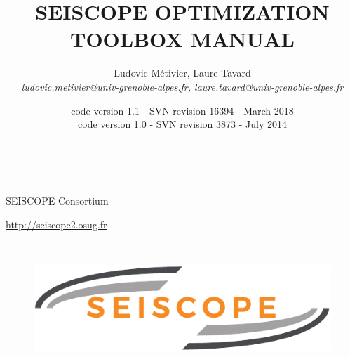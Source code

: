 \documentclass[a4paper,twoside,final,onecolumn,11pt,openright]{article}
\begin{document}
\title{SEISCOPE OPTIMIZATION TOOLBOX MANUAL}

\date{code version 1.1 - SVN revision 16394 - March 2018\\
code version 1.0 - SVN revision 3873 - July 2014}

\author{{\Large{Ludovic M\'etivier, Laure Tavard}} \\
{\it{ludovic.metivier@univ-grenoble-alpes.fr, laure.tavard@univ-grenoble-alpes.fr}}}

\maketitle

$\;$ \\[2 cm]
	
{\huge{\bf{\centerline{SEISCOPE Consortium}}}} 
{\large{\bf{\centerline{\url{http://seiscope2.osug.fr}}}}} 
	
$\;$ \\[1 cm]

\begin{figure}[ht!]
\begin{center}
\includegraphics[width=12 cm]{logo}
\end{center}
\label{figlogo}
\end{figure}

 \newpage
 \strut
 \newpage
\end{document}
